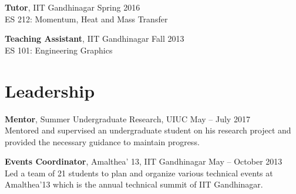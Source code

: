 \documentclass[margin]{res}
\begin{document}
\begin{resume}
{\bf Tutor}, IIT Gandhinagar \hfill Spring 2016 \\
ES 212: Momentum, Heat and Mass Transfer
\vspace{-0.1cm}

{\bf Teaching Assistant}, IIT Gandhinagar \hfill Fall 2013 \\
ES 101: Engineering Graphics


\section{\large Leadership}
{\bf Mentor}, Summer Undergraduate Research, UIUC \hfill May -- July 2017 \\
Mentored and supervised an undergraduate student on his research project and provided the necessary guidance to maintain progress.

{\bf Events Coordinator}, Amalthea' 13, IIT Gandhinagar \hfill May -- October 2013 \\
Led a team of 21 students to plan and organize various technical events at Amalthea'13 which is the annual technical summit of IIT Gandhinagar.

%
%

\end{resume}
\end{document}
